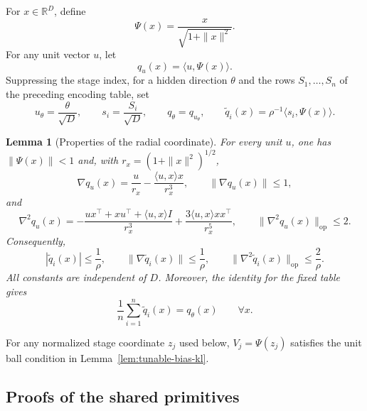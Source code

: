 \documentclass{article}
\newcommand{\R}{\mathbb{R}}
\newtheorem{lemma}[theorem]{Lemma}
\theoremstyle{definition}
\newcommand{\op}{\mathrm{op}}
\begin{document}
For $x\in\R^D$, define
\begin{equation}
 \Psi(x)=\frac{x}{\sqrt{1+\|x\|^2}}.
 \label{eq:radial-saturation}
\end{equation}
For any unit vector $u$, let
\begin{equation}
    q_u(x)=\langle u,\Psi(x)\rangle.
\end{equation}
Suppressing the stage index, for a hidden direction $\theta$ and the rows
$S_1,\ldots,S_n$ of the preceding encoding table, set
\begin{equation}
 u_\theta=\frac\theta{\sqrt D},
 \qquad s_i=\frac{S_i}{\sqrt D},
 \qquad q_\theta=q_{u_\theta},
 \qquad \widetilde q_i(x)=\rho^{-1}\langle s_i,\Psi(x)\rangle.
 \label{eq:radial-global-component}
\end{equation}
\begin{lemma}[Properties of the radial coordinate]
\label{lem:radial-first-second}
For every unit $u$, one has $\|\Psi(x)\|<1$ and, with
$r_x=(1+\|x\|^2)^{1/2}$,
\begin{equation}
 \nabla q_u(x)=\frac{u}{r_x}
 -\frac{\langle u,x\rangle x}{r_x^3},
 \qquad
 \|\nabla q_u(x)\|\le1,
 \label{eq:radial-gradient}
\end{equation}
and
\begin{equation}
 \nabla^2q_u(x)
 =-\frac{ux^\top+xu^\top+\langle u,x\rangle I}{r_x^3}
 +\frac{3\langle u,x\rangle xx^\top}{r_x^5},
 \qquad
 \|\nabla^2q_u(x)\|_{\op}\le2.
 \label{eq:radial-hessian}
\end{equation}
Consequently,
\begin{equation}
 |\widetilde q_i(x)|\le\frac1\rho,
 \qquad
 \|\nabla\widetilde q_i(x)\|\le\frac1\rho,
 \qquad
 \|\nabla^2\widetilde q_i(x)\|_{\op}\le\frac2\rho.
 \label{eq:component-radial-bounds}
\end{equation}
All constants are independent of $D$.
Moreover, the identity for the fixed table gives
\begin{equation}
 \frac1n\sum_{i=1}^n\widetilde q_i(x)=q_\theta(x)
 \qquad\forall x.
 \label{eq:radial-exact-average}
\end{equation}
\end{lemma}

For any normalized stage coordinate $z_j$ used below,
$V_j=\Psi(z_j)$ satisfies the unit ball condition in
Lemma~\ref{lem:tunable-bias-kl}.

\subsection{Proofs of the shared primitives}
\end{document}
